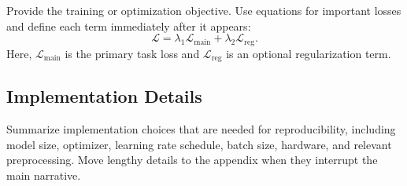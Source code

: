 Provide the training or optimization objective.
Use equations for important losses and define each term immediately after it appears:
\begin{equation}
    \mathcal{L} = \lambda_1 \mathcal{L}_{\mathrm{main}} + \lambda_2 \mathcal{L}_{\mathrm{reg}}.
\end{equation}
Here, $\mathcal{L}_{\mathrm{main}}$ is the primary task loss and $\mathcal{L}_{\mathrm{reg}}$ is an optional regularization term.

\subsection{Implementation Details}

Summarize implementation choices that are needed for reproducibility, including model size, optimizer, learning rate schedule, batch size, hardware, and relevant preprocessing.
Move lengthy details to the appendix when they interrupt the main narrative.
